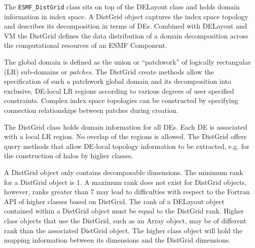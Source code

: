 

\label{sec:DistGrid}
The {\tt ESMF\_DistGrid} class sits on top of the DELayout class and holds domain 
information in index space. A DistGrid object captures the index space topology and 
describes its decomposition in terms of DEs. Combined with DELayout and VM the DistGrid 
defines the data distribution of a domain decomposition across the computational 
resources of an ESMF Component.

The global domain is defined as the union or ``patchwork'' of logically rectangular (LR) 
sub-domains or {\em patches}. The DistGrid create methods allow the specification of such 
a patchwork global domain and its decomposition into exclusive, DE-local LR regions 
according to various degrees of user specified constraints. Complex index space topologies 
can be constructed by specifying connection relationships between patches during creation.

The DistGrid class holds domain information for all DEs. Each DE is associated with a local 
LR region. No overlap of the regions is allowed. The DistGrid offers query methods that 
allow DE-local topology information to be extracted, e.g. for the construction of halos by 
higher classes.

A DistGrid object only contains decomposable dimensions. The minimum rank for a DistGrid 
object is 1. A maximum rank does not exist for DistGrid objects, however, ranks greater than 
7 may lead to difficulties with respect to the Fortran API of higher classes based on 
DistGrid. The rank of a DELayout object contained within a DistGrid object must be equal to 
the DistGrid rank. Higher class objects that use the DistGrid, such as an Array object, may 
be of different rank than the associated DistGrid object. The higher class object will hold 
the mapping information between its dimensions and the DistGrid dimensions.
